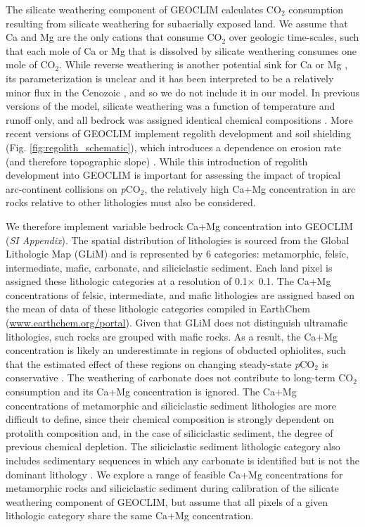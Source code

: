 \documentclass[9pt,twocolumn,twoside,lineno]{pnas-new}
\newcommand{\degrees}{\textdegree\xspace}
\newcommand{\pCOtwo}{\textit{p}CO$_{2}$\xspace}
\newcommand{\COtwo}{CO$_{2}$\xspace}
\newcommand{\SI}{\textit{SI Appendix}\xspace}
\begin{document}
The silicate weathering component of GEOCLIM calculates \COtwo consumption resulting from silicate weathering for subaerially exposed land. We assume that Ca and Mg are the only cations that consume \COtwo over geologic time-scales, such that each mole of Ca or Mg that is dissolved by silicate weathering consumes one mole of \COtwo. While reverse weathering is another potential sink for Ca or Mg \citep{Michalopoulos1995a}, its parameterization is unclear and it has been interpreted to be a relatively minor flux in the Cenozoic \citep{Isson2018a}, and so we do not include it in our model. In previous versions of the model, silicate weathering was a function of temperature and runoff only, and all bedrock was assigned identical chemical compositions \cite{Godderis2017c}. More recent versions of GEOCLIM implement regolith development and soil shielding (Fig. \ref{fig:regolith_schematic}), which introduces a dependence on erosion rate (and therefore topographic slope) \cite{Maffre2018a}. While this introduction of regolith development into GEOCLIM is important for assessing the impact of tropical arc-continent collisions on \pCOtwo, the relatively high Ca+Mg concentration in arc rocks relative to other lithologies must also be considered.

We therefore implement variable bedrock Ca+Mg concentration into GEOCLIM (\SI). The spatial distribution of lithologies is sourced from the Global Lithologic Map (GLiM) \cite{Hartmann2012a} and is represented by 6 categories: metamorphic, felsic, intermediate, mafic, carbonate, and siliciclastic sediment. Each land pixel is assigned these lithologic categories at a resolution of 0.1\degrees $\times$ 0.1\degrees. The Ca+Mg concentrations of felsic, intermediate, and mafic lithologies are assigned based on the mean of data of these lithologic categories compiled in EarthChem (\url{www.earthchem.org/portal}). Given that GLiM does not distinguish ultramafic lithologies, such rocks are grouped with mafic rocks. As a result, the Ca+Mg concentration is likely an underestimate in regions of obducted ophiolites, such that the estimated effect of these regions on changing steady-state \pCOtwo is conservative \cite{Schopka2011a}. The weathering of carbonate does not contribute to long-term \COtwo consumption and its Ca+Mg concentration is ignored. The Ca+Mg concentrations of metamorphic and siliciclastic sediment lithologies are more difficult to define, since their chemical composition is strongly dependent on protolith composition and, in the case of siliciclastic sediment, the degree of previous chemical depletion. The siliciclastic sediment lithologic category also includes sedimentary sequences in which any carbonate is identified but is not the dominant lithology \cite{Hartmann2012a}. We explore a range of feasible Ca+Mg concentrations for metamorphic rocks and siliciclastic sediment during calibration of the silicate weathering component of GEOCLIM, but assume that all pixels of a given lithologic category share the same Ca+Mg concentration.
\end{document}
